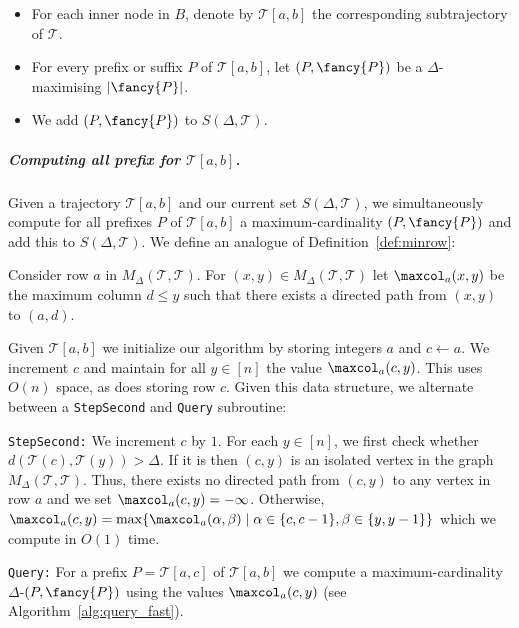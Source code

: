 \documentclass[english, thm-restate]{lipics-v2021}
\begin{document}
\begin{itemize}
    \item For each inner node in $B$, denote by  $\mathcal{T}[a, b]$ the corresponding subtrajectory of $\mathcal{T}$.
    \item For every prefix or suffix $P$ of $\mathcal{T}[a, b]$, let  $(P, {\fancy{P}})$ be a $\Delta$-\pathlet  maximising $|{\fancy{P}}|$.  
    \item We add $(P, {\fancy{P}})$ to $S(\Delta, \mathcal{T})$.
\end{itemize}


\subparagraph{Computing all prefix \pathlets for $\mathcal{T}[a, b]$.}
Given a trajectory $\mathcal{T}[a, b]$ and our current set $S(\Delta, \mathcal{T})$, we simultaneously compute for all prefixes $P$ of $\mathcal{T}[a, b]$ a maximum-cardinality \pathlet $(P, {\fancy{P}})$ and add this \pathlet to $S(\Delta, \mathcal{T})$.
We define an analogue of Definition~\ref{def:minrow}: 


\begin{definition}
Consider row $a$ in $M_\Delta(\mathcal{T}, \mathcal{T})$. 
    For $(x, y) \in M_\Delta(\mathcal{T}, \mathcal{T})$ let $\maxcol_a(x, y)$ be the maximum column $d \leq y$ such that there exists a directed path from $(x, y)$ to $(a, d)$.
\end{definition}


\noindent
Given $\mathcal{T}[a,b]$ we initialize our algorithm by storing integers $a$ and $c \gets a$. 
We increment $c$ and maintain for all $y \in [n]$ the value $\maxcol_a(c, y)$. This uses $O(n)$ space, as does storing row $c$. 
Given this data structure, we alternate between a \texttt{StepSecond} and \texttt{Query} subroutine:

  \vspace{0.5cm}
\texttt{StepSecond:} We increment $c$ by $1$. 
For each $y \in [n]$, we first check whether $d(\mathcal{T}(c), \mathcal{T}(y)) > \Delta$.
If it is then $(c, y)$ is an isolated vertex in the graph $M_\Delta(\mathcal{T}, \mathcal{T})$. Thus, there exists no directed path from $(c, y)$ to any vertex in row $a$ and we set $\maxcol_a(c, y) = - \infty$. 
Otherwise, $\maxcol_a(c, y) = \max \{ \maxcol_a(\alpha, \beta) \mid  \alpha \in \{ c, c - 1 \}, \beta \in \{ y, y - 1 \}   \}$ which we compute in $O(1)$ time. 

\texttt{Query:}
For a prefix $P = \mathcal{T}[a, c]$ of $\mathcal{T}[a, b]$ we compute a maximum-cardinality $\Delta$-\pathlet $(P, {\fancy{P}})$ using the values $\maxcol_a(c, y)$ (see Algorithm~\ref{alg:query_fast}). 
\end{document}
